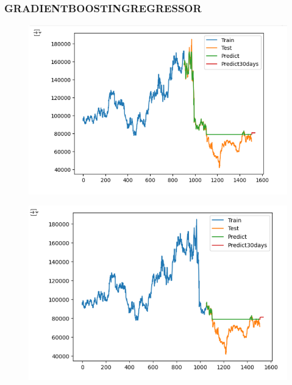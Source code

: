 \documentclass{article}
\begin{document}
\begin{multicols}{2}
\subsubsection{GRADIENTBOOSTINGREGRESSOR}
\begin{figure}[H]
    \centering
    \begin{minipage}{0.15\textwidth}
    \centering
    \includegraphics[width=1\textwidth]{Image/GradientBoosting/LG_30_6_4_GradientBoostingRegressor.png}
   
    \label{fig:1}
    \end{minipage}%
    \begin{minipage}{0.15\textwidth}
    \centering
    \includegraphics[width=1\textwidth]{Image/GradientBoosting/LG_30_7_3_GradientBoostingRegressor.png}
  

\end{minipage}
\end{figure}
\end{multicols}
\end{document}
